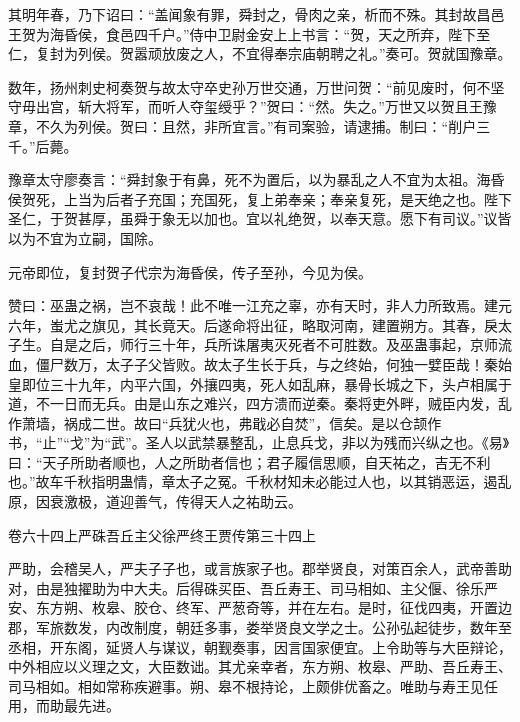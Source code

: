 \documentclass[12pt,UTF8]{ctexbook}
\begin{document}
其明年春，乃下诏曰：“盖闻象有罪，舜封之，骨肉之亲，析而不殊。其封故昌邑王贺为海昏侯，食邑四千户。”侍中卫尉金安上上书言：“贺，天之所弃，陛下至仁，复封为列侯。贺嚣顽放废之人，不宜得奉宗庙朝聘之礼。”奏可。贺就国豫章。



数年，扬州刺史柯奏贺与故太守卒史孙万世交通，万世问贺：“前见废时，何不坚守毋出宫，斩大将军，而听人夺玺绶乎？”贺曰：“然。失之。”万世又以贺且王豫章，不久为列侯。贺曰：且然，非所宜言。”有司案验，请逮捕。制曰：“削户三千。”后薨。



豫章太守廖奏言：“舜封象于有鼻，死不为置后，以为暴乱之人不宜为太祖。海昏侯贺死，上当为后者子充国；充国死，复上弟奉亲；奉亲复死，是天绝之也。陛下圣仁，于贺甚厚，虽舜于象无以加也。宜以礼绝贺，以奉天意。愿下有司议。”议皆以为不宜为立嗣，国除。



元帝即位，复封贺子代宗为海昏侯，传子至孙，今见为侯。



赞曰：巫蛊之祸，岂不哀哉！此不唯一江充之辜，亦有天时，非人力所致焉。建元六年，蚩尤之旗见，其长竟天。后遂命将出征，略取河南，建置朔方。其春，戾太子生。自是之后，师行三十年，兵所诛屠夷灭死者不可胜数。及巫蛊事起，京师流血，僵尸数万，太子子父皆败。故太子生长于兵，与之终始，何独一嬖臣哉！秦始皇即位三十九年，内平六国，外攘四夷，死人如乱麻，暴骨长城之下，头卢相属于道，不一日而无兵。由是山东之难兴，四方溃而逆秦。秦将吏外畔，贼臣内发，乱作萧墙，祸成二世。故曰“兵犹火也，弗戢必自焚”，信矣。是以仓颉作书，“止”“戈”为“武”。圣人以武禁暴整乱，止息兵戈，非以为残而兴纵之也。《易》曰：“天子所助者顺也，人之所助者信也；君子履信思顺，自天祐之，吉无不利也。”故车千秋指明蛊情，章太子之冤。千秋材知未必能过人也，以其销恶运，遏乱原，因衰激极，道迎善气，传得天人之祐助云。





卷六十四上严硃吾丘主父徐严终王贾传第三十四上



严助，会稽吴人，严夫子子也，或言族家子也。郡举贤良，对策百余人，武帝善助对，由是独擢助为中大夫。后得硃买臣、吾丘寿王、司马相如、主父偃、徐乐严安、东方朔、枚皋、胶仓、终军、严葱奇等，并在左右。是时，征伐四夷，开置边郡，军旅数发，内改制度，朝廷多事，娄举贤良文学之士。公孙弘起徒步，数年至丞相，开东阁，延贤人与谋议，朝觐奏事，因言国家便宜。上令助等与大臣辩论，中外相应以义理之文，大臣数诎。其尤亲幸者，东方朔、枚皋、严助、吾丘寿王、司马相如。相如常称疾避事。朔、皋不根持论，上颇俳优畜之。唯助与寿王见任用，而助最先进。
\end{document}
